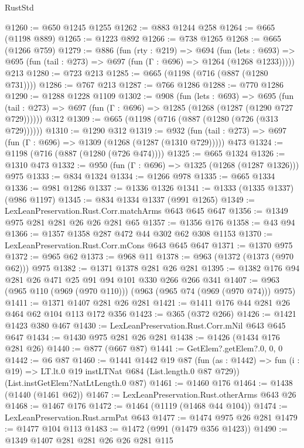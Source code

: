 \begin{lexlean}{RustStd}
\begin{coremodule}
@1260 := @650 @1245 @1255
@1262 := @883 @1244 @258
@1264 := @665 (@1198 @889)
@1265 := @1223 @892
@1266 := @738 @1265
@1268 := @665 (@1266 @759)
@1279 := @886
    (fun (rty : @219) =>
    @694
      (fun (lets : @693) =>
      @695 (fun (tail : @273) => @697 (fun (Γ : @696) => @1264 (@1268 @1233)))))
    @213
@1280 := @723 @213
@1285 := @665 (@1198 (@716 (@887 (@1280 @731))))
@1286 := @767 @213
@1287 := @766 @1286
@1288 := @770 @1286
@1290 := @1288 @1228 @1109
@1302 := @908
    (fun (lets : @693) =>
    @695 (fun (tail : @273) => @697 (fun (Γ : @696) => @1285 (@1268 (@1287 (@1290 @727 @729))))))
    @312
@1309 := @665 (@1198 (@716 (@887 (@1280 (@726 (@313 @729))))))
@1310 := @1290 @312
@1319 := @932
    (fun (tail : @273) => @697 (fun (Γ : @696) => @1309 (@1268 (@1287 (@1310 @729)))))
    @473
@1324 := @1198 (@716 (@887 (@1280 (@726 @474))))
@1325 := @665 @1324
@1326 := @1310 @473
@1332 := @950 (fun (Γ : @696) => @1325 (@1268 (@1287 @1326))) @975
@1333 := @834 @1324
@1334 := @1266 @978
@1335 := @665 @1334
@1336 := @981 @1286
@1337 := @1336 @1326
@1341 := @1333 (@1335 @1337) (@986 @1197)
@1345 := @834 @1334 @1337 (@991 @1265)
@1349 := LexLeanPreservation.Rust.Corr.matchArms @643 @645 @647
@1356 := @1349 @975 @281 @281 @26 @26 @281 @65
@1357 := @1356 @176
@1358 := @43 @94
@1366 := @1357 @1358 @287 @472 @44 @302 @62 @308 @1153
@1370 := LexLeanPreservation.Rust.Corr.mCons @643 @645 @647
@1371 := @1370 @975
@1372 := @965 @62
@1373 := @968 @11
@1378 := @963 (@1372 (@1373 (@970 @62))) @975
@1382 := @1371 @1378 @281 @26 @281
@1395 := @1382 @176 @94 @281 @26 @471 @25 @91 @94 @101 @330 @266 @266 @341
@1407 := @963 (@965 @110 (@969 (@970 @110))) (@963 (@965 @74 (@969 (@970 @74))) @975)
@1411 := @1371 @1407 @281 @26 @281
@1421 := @1411 @176 @44 @281 @26 @464 @62 @104 @113 @172 @356
@1423 := @365 (@372 @266)
@1426 := @1421 @1423 @380 @467
@1430 := LexLeanPreservation.Rust.Corr.mNil @643 @645 @647
@1434 := @1430 @975 @281 @26 @281
@1438 := @1426 (@1434 @176 @281 @26)
@1440 := @877 (@667 @87)
@1441 := GetElem?.getElem?.{0, 0, 0}
@1442 := @6 @87
@1460 := @1441
    @1442
    @19
    @87
    (fun (as : @1442) => fun (i : @19) => LT.lt.{0} @19 instLTNat @684 (List.length.{0} @87 @729))
    (List.instGetElem?NatLtLength.{0} @87)
@1461 := @1460 @176
@1464 := @1438 (@1440 (@1461 @62))
@1467 := LexLeanPreservation.Rust.otherArms @643 @26
@1468 := @1467 @176
@1472 := @1464 (@1119 (@1468 @44 @104))
@1474 := LexLeanPreservation.Rust.armPat @643
@1477 := @1474 @975 @26 @281
@1479 := @1477 @104 @113
@1483 := @1472 (@991 (@1479 @356 @1423))
@1490 := @1349 @1407 @281 @281 @26 @26 @281 @115

\end{coremodule}
\end{lexlean}
